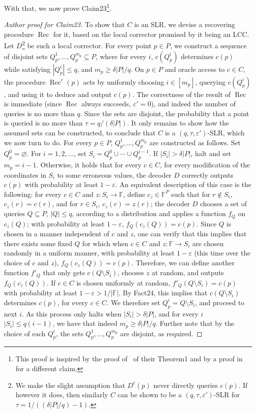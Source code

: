 With that, we now prove Claim23\footnote{This proof is inspired by the proof of~\cite{ref23} of their Theorem1 and by a proof in~\cite{ref41} for a different claim.}.
\begin{proof}[Author proof for Claim23]
To show that $C$ is an SLR, we devise a recovering procedure $\operatorname{Rec}$ for it, based on the local corrector promised by it being an LCC. Let $D$\footnote{We make the slight assumption that $D^c(p)$ never directly queries $c(p)$. If however it does, then similarly $C$ can be shown to be a $(q,\tau,\varepsilon')$-SLR for $\tau=1/((\delta|P|/q)-1)$.} be such a local corrector. For every point $p\in P$, we construct a sequence of disjoint sets $Q_p^1,\ldots,Q_p^{m_p}\subseteq P$, where for every $i$, $c(Q_p^i)$ determines $c(p)$ while satisfying $|Q_p^i|\leq q$, and $m_p\geq\delta|P|/q$. On $p\in P$ and oracle access to $c\in C$, the procedure $\operatorname{Rec}^c(p)$ acts by uniformly choosing $i\in[m_p]$, querying $c(Q_p^i)$, and using it to deduce and output $c(p)$. The correctness of the result of $\operatorname{Rec}$ is immediate (since $\operatorname{Rec}$ always succeeds, $\varepsilon'=0$), and indeed the number of queries is no more than $q$. Since the sets are disjoint, the probability that a point is queried is no more than $\tau=q/(\delta|P|)$. It only remains to show how the assumed sets can be constructed, to conclude that $C$ is a $(q,\tau,\varepsilon')$-SLR, which we now turn to do.
For every $p\in P$, $Q_p^1,\ldots,Q_p^{m_p}$ are constructed as follows. Set $Q_p^0=\varnothing$. For $i=1,2,\ldots$, set $S_i=Q_p^0\cup\cdots\cup Q_p^{i-1}$. If $|S_i|>\delta|P|$, halt and set $m_p=i-1$. Otherwise, it holds that for every $c\in C$, for every modification of the coordinates in $S_i$ to some erroneous values, the decoder $D$ correctly outputs $c(p)$ with probability at least $1-\varepsilon$. An equivalent description of this case is the following: for every $c\in C$ and $z:S_i\to\mathbb F$, define $c_z\in\mathbb F^P$ such that for $r\notin S_i$, $c_z(r)=c(r)$, and for $r\in S_i$, $c_z(r)=z(r)$; the decoder $D$ chooses a set of queries $Q\subseteq P$, $|Q|\leq q$, according to a distribution and applies a function $f_Q$ on $c_z(Q)$; with probability at least $1-\varepsilon$, $f_Q(c_z(Q))=c(p)$. Since $Q$ is chosen in a manner independent of $c$ and $z$, one can verify that this implies that there exists some fixed $Q$ for which when $c\in C$ and $z:\mathbb F\to S_i$ are chosen randomly in a uniform manner, with probability at least $1-\varepsilon$ (this time over the choice of $c$ and $z$), $f_Q(c_z(Q))=c(p)$. Therefore, we can define another function $f'_Q$ that only gets $c(Q\setminus S_i)$, chooses $z$ at random, and outputs $f_Q(c_z(Q))$. If $c\in C$ is chosen uniformly at random, $f'_Q(Q\setminus S_i)=c(p)$ with probability at least $1-\varepsilon>1/|\mathbb F|$. By Fact24, this implies that $c(Q\setminus S_i)$ determines $c(p)$, for every $c\in C$. We therefore set $Q_p^i=Q\setminus S_i$, and proceed to next $i$. As this process only halts when $|S_i|>\delta|P|$, and for every $i$ $|S_i|\leq q(i-1)$, we have that indeed $m_p\geq\delta|P|/q$. Further note that by the choice of each $Q_p^i$, the sets $Q_p^1,\ldots,Q_p^{m_p}$ are disjoint, as required.
\end{proof}
